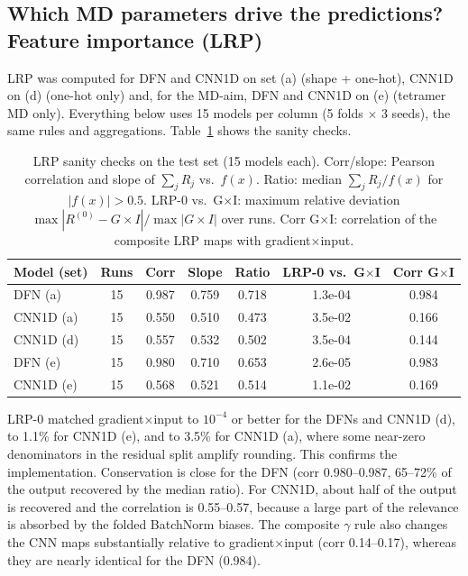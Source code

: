 \subsection{Which MD parameters drive the predictions? Feature importance (LRP)}\label{sec:lrpr}
LRP was computed for DFN and CNN1D on set (a) (shape + one-hot), CNN1D on (d) (one-hot only) and, for the MD-aim, DFN and CNN1D on (e) (tetramer MD only). Everything below uses 15 models per column (5 folds $\times$ 3 seeds), the same rules and aggregations. Table~\ref{tab:lrpcons} shows the sanity checks.
\begin{table}[H]\centering\small
\caption{LRP sanity checks on the test set (15 models each). Corr/slope: Pearson correlation and slope of $\sum_j R_j$ vs.\ $f(x)$. Ratio: median $\sum_j R_j/f(x)$ for $|f(x)|>0.5$. LRP-0 vs.\ G$\times$I: maximum relative deviation $\max|R^{(0)}-G{\times}I|/\max|G{\times}I|$ over runs. Corr G$\times$I: correlation of the composite LRP maps with gradient$\times$input.}
\begin{tabular}{lcccccc}\toprule
Model (set) & Runs & Corr & Slope & Ratio & LRP-0 vs.\ G$\times$I & Corr G$\times$I\\\midrule
DFN (a) & 15 & 0.987 & 0.759 & 0.718 & 1.3e-04 & 0.984 \\
CNN1D (a) & 15 & 0.550 & 0.510 & 0.473 & 3.5e-02 & 0.166 \\
CNN1D (d) & 15 & 0.557 & 0.532 & 0.502 & 3.5e-04 & 0.144 \\
DFN (e) & 15 & 0.980 & 0.710 & 0.653 & 2.6e-05 & 0.983 \\
CNN1D (e) & 15 & 0.568 & 0.521 & 0.514 & 1.1e-02 & 0.169 \\
\bottomrule\end{tabular}\label{tab:lrpcons}\end{table}
LRP-0 matched gradient$\times$input to $10^{-4}$ or better for the DFNs and CNN1D (d), to 1.1\% for CNN1D (e), and to 3.5\% for CNN1D (a), where some near-zero denominators in the residual split amplify rounding. This confirms the implementation. Conservation is close for the DFN (corr 0.980--0.987, 65--72\% of the output recovered by the median ratio). For CNN1D, about half of the output is recovered and the correlation is 0.55--0.57, because a large part of the relevance is absorbed by the folded BatchNorm biases. The composite $\gamma$ rule also changes the CNN maps substantially relative to gradient$\times$input (corr 0.14--0.17), whereas they are nearly identical for the DFN (0.984).

